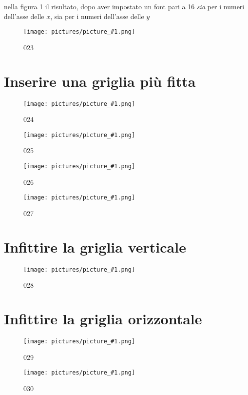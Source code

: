 \documentclass[17pt]{extarticle}
\newcommand{\pict}[1]{
\begin{figure}[h!]		
	\centering
   	\texttt{[image: pictures/picture\_\#1.png]}
  	\caption{#1}
   	\label{fig:LibreOfficeCalc#1}
\end{figure}
}
\begin{document}
nella figura \ref{fig:LibreOfficeCalc023} il risultato, dopo aver impostato un font pari a 16 \emph{sia} per i numeri dell'asse delle $x$, sia per i numeri dell'asse delle $y$

%
\pict{023}


\newpage

\section{Inserire una griglia più fitta}

%
\pict{024}


%
\pict{025}


%
\pict{026}


%
\pict{027}






\newpage
\mbox{}
\newpage

\section{Infittire la griglia verticale}



%
\pict{028}

\newpage


\section{Infittire la griglia orizzontale}

%
\pict{029}


%
\pict{030}
\end{document}
